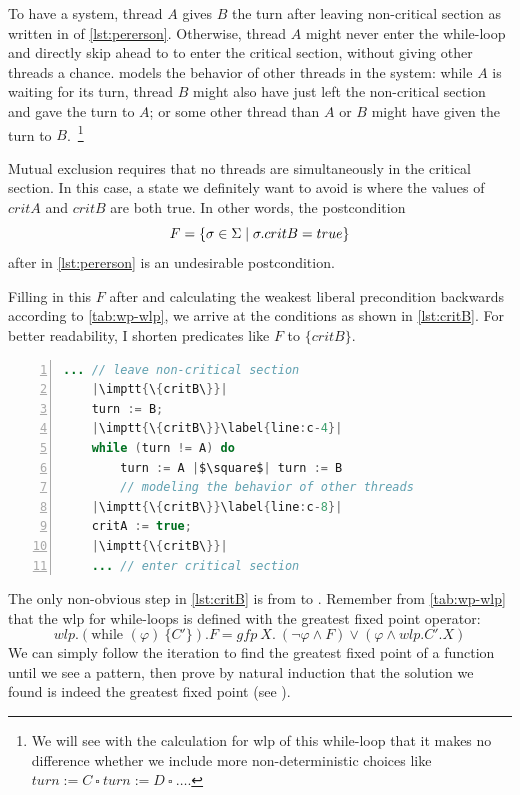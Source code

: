 To have a  system, thread $A$ gives $B$ the turn after leaving non-critical section as written in  of \autoref{lst:pererson}. 
Otherwise, thread $A$ might never enter the while-loop and directly skip ahead to  to enter the critical section, without giving other threads a chance. 
 models the behavior of other threads in the system: while $A$ is waiting for its turn, thread $B$ might also have just left the non-critical section and gave the turn to $A$; or some other thread than $A$ or $B$ might have given the turn to $B$.~\footnote{We will see with the calculation for wlp of this while-loop that it makes no difference whether we include more non-deterministic choices like $turn := C\ \square\ turn := D\ \square\ \dots$.} 

Mutual exclusion requires that no threads are simultaneously in the critical section. 
In this case, a state we definitely want to avoid is where the values of $critA$ and $critB$ are both true. 
In other words, the postcondition 
$$F=\{\sigma\in\S\mid \sigma.critB=true\}$$ 
after  in \autoref{lst:pererson} is an undesirable postcondition.

Filling in this $F$ after  and calculating the weakest liberal precondition backwards according to \autoref{tab:wp-wlp}, we arrive at the conditions as shown in \autoref{lst:critB}. 
For better readability, I shorten predicates like $F$ to $\{critB\}$.

\begin{lstlisting}[caption={Weakest Liberal Precondition w.r.t Postcondition $F=\{\sigma\in\S\mid \sigma.critB=true\}$ }, label={lst:critB}, language=java, numbers=left, stepnumber=1, captionpos=b,escapechar=|,frame=single]
	... // leave non-critical section
	|\imptt{\{critB\}}|
	turn := B;
	|\imptt{\{critB\}}\label{line:c-4}|
	while (turn != A) do 
		turn := A |$\square$| turn := B 
		// modeling the behavior of other threads
	|\imptt{\{critB\}}\label{line:c-8}|
	critA := true;
	|\imptt{\{critB\}}|
	... // enter critical section  
\end{lstlisting}

The only non-obvious step in \autoref{lst:critB} is from  to . 
Remember from \autoref{tab:wp-wlp} that the wlp for while-loops is defined with the greatest fixed point operator: 
\[
	wlp.(\text{while }(\varphi)\ \{C'\}).F = gfp\ X.\ (\neg\varphi\wedge F)\vee(\varphi\wedge wlp.C'.X)
\]
We can simply follow the iteration to find the greatest fixed point of a function until we see a pattern, then prove by natural induction that the solution we found is indeed the greatest fixed point (see ).


